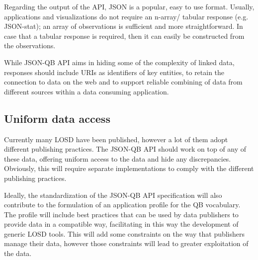 \documentclass{llncs}
\begin{document}
Regarding the output of the API, JSON is a popular, easy to use format. Usually, applications and visualizations do not require an n-array/ tabular response (e.g. JSON-stat); an array of observations is sufficient and more straightforward. In case that a tabular response is required, then it can easily be constructed from the observations. 


While JSON-QB API aims in hiding some of the complexity of linked data, responses should include URIs as identifiers of key entities, to retain the connection to data on the web and to support reliable combining of data from different sources within a data consuming application.

\subsection{Uniform data access}

Currently many LOSD have been published, however a lot of them adopt different publishing practices. The JSON-QB API should work on top of any of these data, offering uniform access to the data and hide any discrepancies. Obviously, this will require separate implementations to comply with the different publishing practices. 

Ideally, the standardization of the JSON-QB API specification will also contribute to the formulation of an application profile for the QB vocabulary. The profile will include best practices that can be used by data publishers to provide data in a compatible way, facilitating in this way the development of generic LOSD tools. This will add some constraints on the way that publishers manage their data, however those constraints will lead to greater exploitation of the data. 
\end{document}
